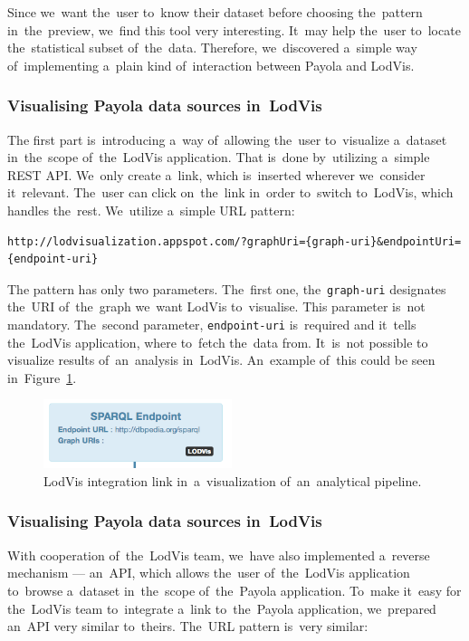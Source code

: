 Since we~want the~user to~know their dataset before choosing the~pattern in~the~preview, we~find this tool very interesting. It~may help the~user to~locate the~statistical subset of~the~data. Therefore, we~discovered a~simple way of~implementing a~plain kind of~interaction between Payola and LodVis.

\subsubsection{Visualising Payola data sources in~LodVis}
The first part is~introducing a~way of~allowing the~user to~visualize a~dataset in~the~scope of~the~LodVis application. That is~done by~utilizing a~simple REST API. We~only create a~link, which is~inserted wherever we~consider it~relevant. The~user can click on~the~link in~order to~switch to~LodVis,
which handles the~rest. We~utilize a~simple URL pattern:

{  \scriptsize
\begin{verbatim}
http://lodvisualization.appspot.com/?graphUri={graph-uri}&endpointUri={endpoint-uri}
\end{verbatim}
}

The pattern has only two parameters. The~first one, the~\texttt{graph-uri} 
designates the~URI of~the~graph we~want LodVis to~visualise. This parameter is~not mandatory. The~second parameter, \texttt{endpoint-uri} is~required and it~tells the~LodVis application, where to~fetch the~data from. It~is~not possible 
to visualize results of~an~analysis in~LodVis. An~example of~this could
be seen in~Figure~\ref{fig:lodvis-int}.

\begin{figure}
	\centering
	\includegraphics[width=55mm]{img/lodvis-int.png}
	\caption{LodVis integration link in~a~visualization of~an~analytical pipeline.}
	\label{fig:lodvis-int}
\end{figure}


\subsubsection{Visualising Payola data sources in~LodVis}
With cooperation of~the~LodVis team, we~have also implemented a~reverse 
mechanism --- an~API, which allows the~user of~the~LodVis application to~browse a~dataset in~the~scope of~the~Payola application. To~make it~easy for the~LodVis 
team to~integrate a~link to~the~Payola application, we~prepared an~API very 
similar to~theirs. The~URL pattern is~very similar:


